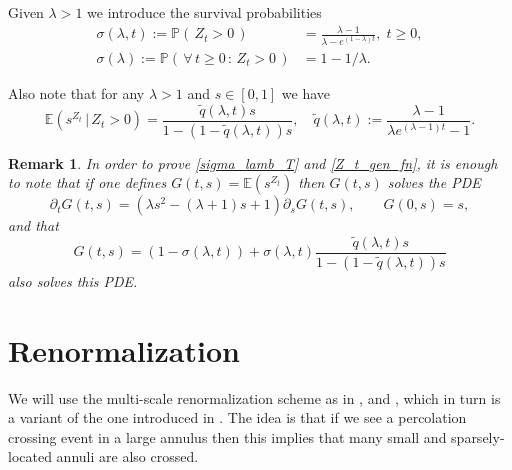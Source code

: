 \documentclass[a4paper,12pt]{article}
\newtheorem  {remark}        [theorem]{Remark}
\begin{document}
Given $\lambda>1$ we introduce the survival probabilities
\begin{align}
\label{sigma_lamb_T}
  \sigma(\lambda,t):=  \mathbb{P}(\, Z_t >0 \, )&=\frac{\lambda-1}{\lambda -e^{(1-\lambda)t } }, \; t \geq 0, \\
  \label{sigma_lambda}
   \sigma(\lambda):=\mathbb{P}(\, \forall \, t \geq 0 \, : \, Z_t >0 \, )&=1-1/\lambda.
\end{align}

Also note that for any $\lambda>1$ and $s \in [0,1]$ we have
\begin{equation}\label{Z_t_gen_fn}
  \mathbb{E}\left( s^{Z_t} \, | \, Z_t >0  \right)=  \frac{ \tilde{q}(\lambda,t)  s}{1-(1-\tilde{q}(\lambda,t))s}, \quad \tilde{q}(\lambda,t):= \frac{\lambda-1}{\lambda e^{(\lambda-1)t} -1 }.
\end{equation}

\begin{remark}
 In order to prove \eqref{sigma_lamb_T} and \eqref{Z_t_gen_fn}, it is enough to note that if one defines
$G(t,s)=\mathbb{E}(s^{Z_t})$ then $G(t,s)$ solves the PDE
\begin{equation}
  \partial_t G(t,s)=(\lambda s^2 -(\lambda+1)s+1) \partial_s G(t,s), \qquad G(0,s)=s,
\end{equation}
and that
\begin{equation}
  G(t,s)=  (1-\sigma(\lambda,t)) + \sigma(\lambda,t) \frac{ \tilde{q}(\lambda,t)  s}{1-(1-\tilde{q}(\lambda,t))s}
\end{equation}
also solves this PDE.
\end{remark}








\section{Renormalization}
\label{section_renorm_intro}


We will use the multi-scale renormalization scheme as in \cite{Ra15}, \cite{RV15} and \cite{RV17}, which in turn is a variant of the one introduced in \cite{sznitman_decoupling}. The idea is that if we see a percolation crossing event in a large annulus then this implies that many small and sparsely-located annuli are also crossed.


\smallskip
\end{document}
